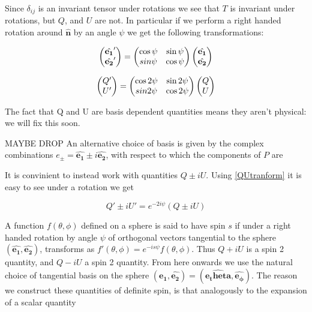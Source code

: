 \documentclass[a4paper,11pt]{article}
\renewcommand{\v}[1]{\mathbf{#1}}
\newcommand{\unit}[1]{\hat{\v{#1}}}
\begin{document}
Since $\delta_{ij}$ is an invariant tensor under rotations we see that $T$ is invariant under rotations, but $Q$, and $U$ are not. In particular if we perform a right handed rotation around $\unit{n}$ by an angle $\psi$ we get the following transformations:


\begin{equation}
\begin{pmatrix}
\unit{e_1}'\\
\unit{e_2}' 
\end{pmatrix}
=
\begin{pmatrix}
\cos{\psi} & \sin{\psi}\\ 
\-sin{\psi} & \cos{\psi}
\end{pmatrix}
\begin{pmatrix}
\unit{e_1}\\
\unit{e_2} 
\end{pmatrix}
\end{equation}


\begin{equation}
\begin{pmatrix}
Q'\\
U' 
\end{pmatrix}
=
\begin{pmatrix}
\cos{2\psi} & \sin{2\psi}\\ 
\-sin{2\psi} & \cos{2\psi}
\end{pmatrix}
\begin{pmatrix}
Q\\
U
\end{pmatrix}
\label{QUtranform}
\end{equation}

The fact that Q and U are basis dependent quantities means they aren't physical: we will fix this soon.

MAYBE DROP
An alternative choice of basis is given by the complex combinations $e_\pm = \unit{e_1} \pm i\unit{e_2}$, with respect to which the components of $P$ are 



It is convinient to instead work with quantities $Q\pm iU$. Using \ref{QUtranform} it is easy to see under a rotation we get  

\begin{equation}
Q'\pm iU' = e^{-2i\psi}(Q\pm iU)
\end{equation}

A function $f(\theta, \phi)$ defined on a sphere is said to have spin $s$ if under a right handed rotation by angle $\psi$ of orthogonal vectors tangential to the sphere $(\unit{e_1}, \unit{e_2})$, transforms as $f'(\theta, \phi) = e^{-is\psi}f(\theta, \phi)$. Thus $Q+iU$ is a spin 2 quantity, and $Q-iU$ a spin 2 quantity. From here onwards we use the natural choice of tangential basis on the sphere $(\unit{e_1}, \unit{e_2}) = (\unit{e_theta}, \unit{e_\phi})$. The reason we construct these quantities of definite spin, is that analogously to the expansion of a scalar quantity
\end{document}
